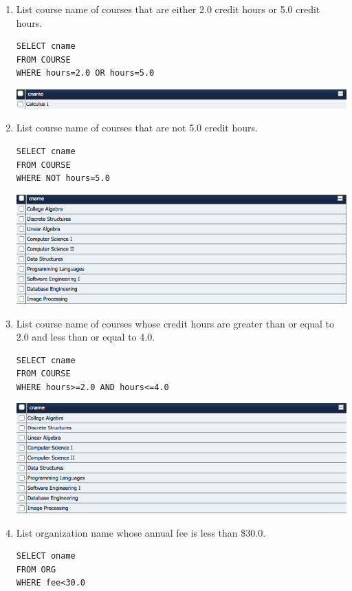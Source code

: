 \documentclass[11pt]{article}
\begin{document}
\begin{enumerate}
\item List course name of courses that are either 2.0 credit hours or 5.0 credit hours.

\begin{verbatim}
SELECT cname
FROM COURSE
WHERE hours=2.0 OR hours=5.0
\end{verbatim}

\includegraphics[scale=0.5]{4.png}
 
\item List course name of courses that are not 5.0 credit hours.

\begin{verbatim}
SELECT cname
FROM COURSE
WHERE NOT hours=5.0
\end{verbatim}

\includegraphics[scale=0.5]{5.png}

\item List course name of courses whose credit  hours are greater than or equal to 2.0 and less than or equal to 4.0.

\begin{verbatim}
SELECT cname
FROM COURSE
WHERE hours>=2.0 AND hours<=4.0
\end{verbatim}

\includegraphics[scale=0.5]{6.png}

\item List organization name whose annual fee is less than \$30.0.

\begin{verbatim}
SELECT oname
FROM ORG
WHERE fee<30.0
\end{verbatim}


\end{enumerate}
\end{document}
